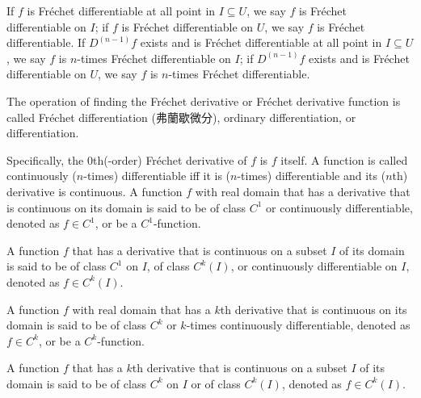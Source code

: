 \documentclass[a4paper,12pt]{report}
\begin{document}
\begin{itemize}
\begin{itemize}
If $f$ is Fréchet differentiable at all point in $I\subseteq U$, we say $f$ is Fréchet differentiable on $I$; if $f$ is Fréchet differentiable on $U$, we say $f$ is Fréchet differentiable. If $D^{(n-1)}f$ exists and is Fréchet differentiable at all point in $I\subseteq U$, we say $f$ is $n$-times Fréchet differentiable on $I$; if $D^{(n-1)}f$ exists and is Fréchet differentiable on $U$, we say $f$ is $n$-times Fréchet differentiable.

The operation of finding the Fréchet derivative or Fréchet derivative function is called Fréchet differentiation (弗蘭歇微分), ordinary differentiation, or differentiation.

Specifically, the $0$th(-order) Fréchet derivative of $f$ is $f$ itself.
A function is called continuously ($n$-times) differentiable iff it is ($n$-times) differentiable and its ($n$th) derivative is continuous.
A function $f$ with real domain that has a derivative that is continuous on its domain is said to be of class $C^1$ or continuously differentiable, denoted as $f\in C^1$, or be a $C^1$-function.

A function $f$ that has a derivative that is continuous on a subset $I$ of its domain is said to be of class $C^1$ on $I$, of class $C^k(I)$, or continuously differentiable on $I$, denoted as $f\in C^k(I)$.

A function $f$ with real domain that has a $k$th derivative that is continuous on its domain is said to be of class $C^k$ or $k$-times continuously differentiable, denoted as $f\in C^k$, or be a $C^k$-function.

A function $f$ that has a $k$th derivative that is continuous on a subset $I$ of its domain is said to be of class $C^k$ on $I$ or of class $C^k(I)$, denoted as $f\in C^k(I)$.


\end{itemize}
\end{itemize}
\end{document}
